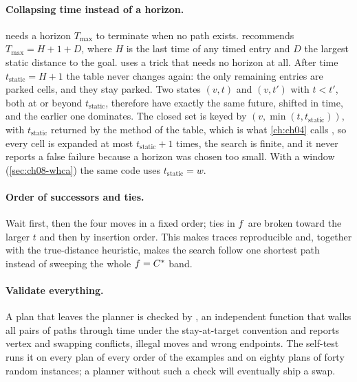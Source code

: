 \paragraph{Collapsing time instead of a horizon.}  needs a horizon
$T_{\max}$ to terminate when no path exists.  recommends
$T_{\max} = H + 1 + D$, where $H$ is the last time of any timed entry and $D$ the largest
static distance to the goal.  uses a trick that needs no horizon
at all. After time $t_{\mathrm{static}} = H + 1$ the table never changes again: the
only remaining entries are parked cells, and they stay parked. Two states $(v, t)$ and
$(v, t')$ with $t < t'$, both at or beyond $t_{\mathrm{static}}$, therefore have
exactly the same future, shifted in time, and the earlier one dominates. The closed set
is keyed by $(v, \min(t, t_{\mathrm{static}}))$, with $t_{\mathrm{static}}$ returned by
the method  of the table, which is what \cref{ch:ch04} calls
, so every cell is expanded at most
$t_{\mathrm{static}} + 1$ times, the search is finite, and it never reports a false
failure because a horizon was chosen too small. With a window (\cref{sec:ch08-whca})
the same code uses $t_{\mathrm{static}} = w$.

\paragraph{Order of successors and ties.} Wait first, then the four moves in a fixed
order; ties in $f$ are broken toward the larger $t$ and then by insertion order.
This makes traces reproducible and, together with the true-distance heuristic, makes
the search follow one shortest path instead of sweeping the whole $f = C^*$ band.

\paragraph{Validate everything.} A plan that leaves the planner is checked by
, an independent function that walks all pairs of paths through time
under the stay-at-target convention and reports vertex and swapping conflicts, illegal
moves and wrong endpoints. The self-test runs it on every plan of every order of the
examples and on eighty plans of forty random instances; a planner without such a check will
eventually ship a swap.

